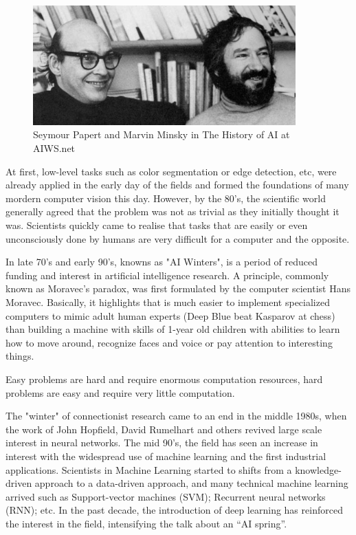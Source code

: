 \documentclass[12pt]{article}
\begin{document}
\begin{figure}[htp]
    \centering
    \includegraphics[width=0.9\textwidth]{images/minsky_papert.jpg}
    \caption{Seymour Papert and Marvin Minsky in The History of AI at AIWS.net}
    \label{fig:papert_minsky}
\end{figure}

At first, low-level tasks such as color segmentation or edge detection, etc, were already 
applied in the early day of the fields and formed the foundations of many mordern computer
vision this day. However, by the 80's, the scientific world generally agreed that the 
problem was not as trivial as they initially thought it was. Scientists quickly came to 
realise that tasks that are easily or even unconsciously done by humans are very difficult 
for a computer and the opposite. 

In late 70's and early 90's, knowns as "AI Winters", is a period of reduced funding and 
interest in artificial intelligence research\cite{aiwinter}. A principle, commonly known 
as Moravec’s paradox\cite{agrawal2010study}, was first formulated by the computer scientist 
Hans Moravec. Basically, it highlights that is much easier to implement specialized computers 
to mimic adult human experts (Deep Blue beat Kasparov at chess\cite{deepblue}) than building a 
machine with skills of 1-year old children with abilities to learn how to move around, 
recognize faces and voice or pay attention to interesting things. 

\begin{displayquote}
    Easy problems are hard and require enormous computation resources, 
    hard problems are easy and require very little computation. 
\end{displayquote}

The "winter" of connectionist research came to an end in the middle 1980s, 
when the work of John Hopfield, David Rumelhart and others revived large scale interest 
in neural networks. The mid 90's, the field has seen an increase in interest with the 
widespread use of machine learning and the first industrial applications. Scientists in Machine Learning started to 
shifts from a knowledge-driven approach to a data-driven approach, and many technical machine 
learning arrived such as Support-vector machines (SVM); Recurrent neural networks (RNN); etc.\cite{708428,medsker2001recurrent}
In the past decade, the introduction of deep learning has reinforced the interest in the field, 
intensifying the talk about an “AI spring”.
\end{document}
